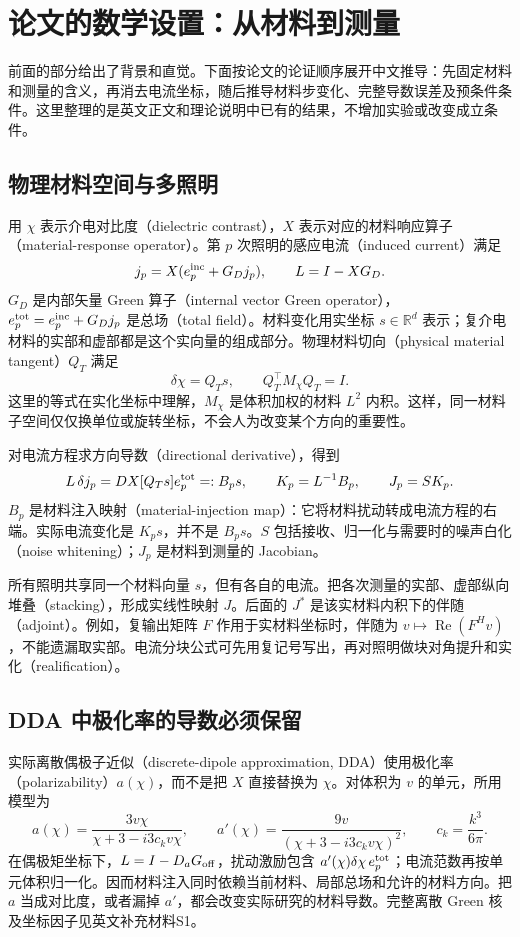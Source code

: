 \section{论文的数学设置：从材料到测量}
前面的部分给出了背景和直觉。下面按论文的论证顺序展开中文推导：先固定材料和测量的含义，再消去电流坐标，随后推导材料步变化、完整导数误差及预条件条件。这里整理的是英文正文和理论说明中已有的结果，不增加实验或改变成立条件。

\subsection{物理材料空间与多照明}
用 $\chi$ 表示介电对比度（dielectric contrast），$X$ 表示对应的材料响应算子（material-response operator）。第 $p$ 次照明的感应电流（induced current）满足
\begin{equation}
 j_p=X(e_p^{\rm inc}+G_Dj_p),\qquad L=I-XG_D.
\end{equation}
$G_D$ 是内部矢量 Green 算子（internal vector Green operator），$e_p^{\rm tot}=e_p^{\rm inc}+G_Dj_p$ 是总场（total field）。材料变化用实坐标 $s\in\mathbb R^d$ 表示；复介电材料的实部和虚部都是这个实向量的组成部分。物理材料切向（physical material tangent）$Q_T$ 满足
\begin{equation}
 \delta\chi=Q_Ts,\qquad Q_T^\top M_\chi Q_T=I.
\end{equation}
这里的等式在实化坐标中理解，$M_\chi$ 是体积加权的材料 $L^2$ 内积。这样，同一材料子空间仅仅换单位或旋转坐标，不会人为改变某个方向的重要性。

对电流方程求方向导数（directional derivative），得到
\begin{equation}
 L\,\delta j_p=DX[Q_Ts]e_p^{\rm tot}=:B_ps,
 \qquad K_p=L^{-1}B_p,\qquad J_p=SK_p.
\end{equation}
$B_p$ 是材料注入映射（material-injection map）：它将材料扰动转成电流方程的右端。实际电流变化是 $K_ps$，并不是 $B_ps$。$S$ 包括接收、归一化与需要时的噪声白化（noise whitening）；$J_p$ 是材料到测量的 Jacobian。

所有照明共享同一个材料向量 $s$，但有各自的电流。把各次测量的实部、虚部纵向堆叠（stacking），形成实线性映射 $J$。后面的 $J^*$ 是该实材料内积下的伴随（adjoint）。例如，复输出矩阵 $F$ 作用于实材料坐标时，伴随为 $v\mapsto\operatorname{Re}(F^Hv)$，不能遗漏取实部。电流分块公式可先用复记号写出，再对照明做块对角提升和实化（realification）。

\subsection{DDA 中极化率的导数必须保留}
实际离散偶极子近似（discrete-dipole approximation, DDA）使用极化率（polarizability）$a(\chi)$，而不是把 $X$ 直接替换为 $\chi$。对体积为 $v$ 的单元，所用模型为
\begin{equation}
 a(\chi)=\frac{3v\chi}{\chi+3-i3c_kv\chi},\qquad
 a'(\chi)=\frac{9v}{(\chi+3-i3c_kv\chi)^2},\qquad c_k=\frac{k^3}{6\pi}.
\end{equation}
在偶极矩坐标下，$L=I-D_aG_{\rm off}$，扰动激励包含 $a'(\chi)\delta\chi\,e_p^{\rm tot}$；电流范数再按单元体积归一化。因而材料注入同时依赖当前材料、局部总场和允许的材料方向。把 $a$ 当成对比度，或者漏掉 $a'$，都会改变实际研究的材料导数。完整离散 Green 核及坐标因子见英文补充材料S1。

